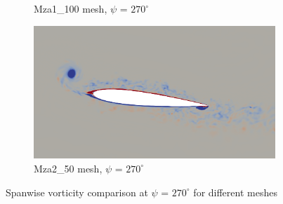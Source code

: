 \begin{figure}[H]
\begin{subfigure}[b]{0.475\textwidth}
		\caption{Mza1\_100 mesh, $\psi$ = $270^\circ$}
		\label{fig:Mza1_100_Re200k_sp_psi270}
	\end{subfigure}
	\begin{subfigure}[b]{0.475\textwidth}
		\centering
		\includegraphics[width=1\textwidth]{figures/zonal_adapt_results/vorticity_plots_Re200k/Mza2_50/phase_270.png}
		\caption{Mza2\_50 mesh, $\psi$ = $270^\circ$}
		\label{fig:Mza2_50_Re200k_sp_psi270}
	\end{subfigure}	
	\caption{Spanwise vorticity comparison at $\psi$ = $270^\circ$ for different meshes}
	\label{fig:vorticity_Re200k_sp_270}
\end{figure}


